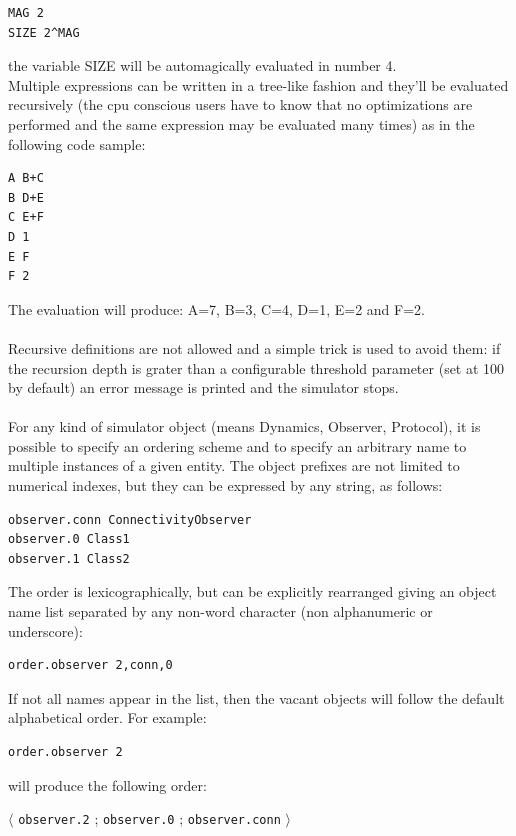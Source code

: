 \documentclass[a4paper,11pt]{article}
\begin{document}
\begin{verbatim}
MAG 2
SIZE 2^MAG
\end{verbatim}

the variable SIZE will be automagically evaluated in number 4.\\
Multiple expressions can be written in a tree-like fashion and they'll
be evaluated recursively (the cpu conscious users have to know that 
no optimizations are performed and the same expression may be evaluated
many times) as in the following code sample:

\begin{verbatim}
A B+C
B D+E
C E+F
D 1
E F
F 2
\end{verbatim}

The evaluation will produce: A=7, B=3, C=4, D=1, E=2 and F=2.\\
\\
Recursive definitions are not allowed and a simple trick is used to 
avoid them: if the recursion depth is grater than a configurable 
threshold parameter (set at 100 by default) an error message is
printed and the simulator stops.\\
\\
For any kind of simulator object (means Dynamics, Observer, Protocol),
it is possible to specify an ordering scheme and to specify an arbitrary 
name to multiple instances of a given entity. The object prefixes are
not limited to numerical indexes, but they can be expressed by any 
string, as follows:

\begin{verbatim}
observer.conn ConnectivityObserver
observer.0 Class1
observer.1 Class2
\end{verbatim}

The order is lexicographically, but can be explicitly rearranged
giving an object name list separated  by any non-word character
(non alphanumeric or underscore):

\begin{verbatim}
order.observer 2,conn,0
\end{verbatim}

If not all names appear in the list,
then the vacant objects will follow the default alphabetical order.
For example:

\begin{verbatim}
order.observer 2
\end{verbatim}

will produce the following order:

\begin{center}
$\langle$ \texttt{observer.2} ; \texttt{observer.0} ; \texttt{observer.conn} $\rangle$
\end{center}
\end{document}
